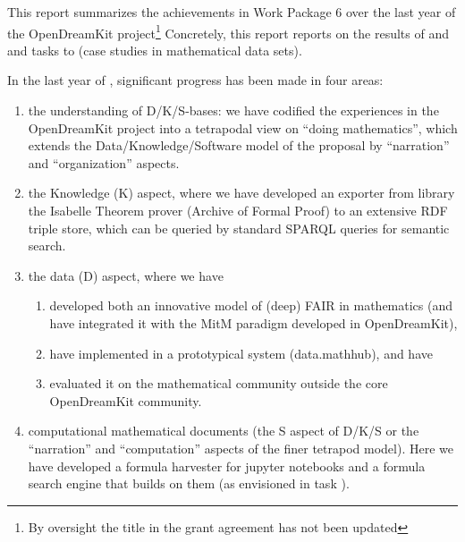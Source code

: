 This report summarizes the achievements in Work Package 6 over the last year of the OpenDreamKit project\footnote{By oversight the title in the grant agreement has not been updated} Concretely, this report reports on the results of  and  and tasks  to  (case studies in mathematical data sets).

In the last year of \pn, significant progress has been made in four areas:
\begin{enumerate}
\item the understanding of D/K/S-bases: we have codified the experiences in the OpenDreamKit project into a tetrapodal view on ``doing mathematics'', which extends the Data/Knowledge/Software model of the proposal by ``narration'' and ``organization'' aspects.
\item the Knowledge (K) aspect, where we have developed an exporter from library the Isabelle Theorem prover (Archive of Formal Proof) to an extensive RDF triple store, which can be queried by standard SPARQL queries for semantic search. \item the data (D) aspect, where we have
  \begin{enumerate}
  \item developed both an innovative model of (deep) FAIR in mathematics (and have integrated it with the MitM paradigm developed in OpenDreamKit),
  \item have implemented in a prototypical system (data.mathhub), and have
  \item evaluated it on the mathematical community outside the core OpenDreamKit community.
  \end{enumerate}
\item computational mathematical documents (the S aspect of D/K/S or the ``narration'' and ``computation'' aspects of the finer tetrapod model). Here we have developed a formula harvester for jupyter notebooks and a formula search engine that builds on them (as envisioned in task ).
\end{enumerate}

